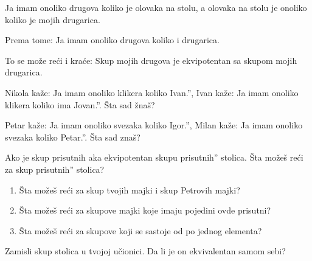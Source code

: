        Ja imam onoliko drugova koliko je olovaka na stolu, a olovaka na stolu je onoliko koliko je mojih drugarica.\

       Prema tome: Ja imam onoliko drugova koliko i drugarica.



       To se mo\v ze re\' ci i kra\' ce: Skup mojih drugova je ekvipotentan sa skupom mojih drugarica.

    \begin{zad}

        Nikola ka\v ze: Ja imam onoliko klikera koliko Ivan.'', Ivan ka\v ze: Ja imam onoliko klikera koliko ima Jovan.''. \v Sta sad \v zna\v s?

    \end{zad}

    \begin{zad}

        Petar ka\v ze: Ja imam onoliko svezaka koliko Igor.'', Milan ka\v ze: Ja imam onoliko svezaka koliko Petar.''.  \v Sta sad zna\v s?

    \end{zad}

    \begin{zad}

        Ako je skup prisutnih \dj aka ekvipotentan skupu prisutnih'' stolica. \v Sta mo\v ze\v s re\' ci za skup prisutnih'' stolica?

    \end{zad}

    \begin{zad}

        \begin{enumerate}

            \item \v Sta mo\v ze\v s re\' ci za skup tvojih majki i skup Petrovih majki?

            \item \v Sta mo\v ze\v s re\' ci za skupove majki koje imaju pojedini ovde prisutni?

            \item \v Sta mo\v ze\v s re\' ci za skupove koji se sastoje od po jednog elementa?

        \end{enumerate}

    \end{zad}

    \begin{zad}

        Zamisli skup stolica u tvojoj u\v cionici. Da li je on ekvivalentan samom sebi?

    \end{zad}

